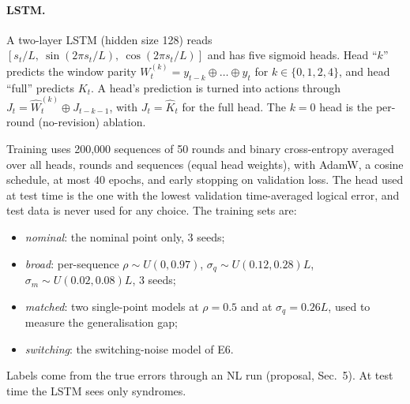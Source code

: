 \paragraph{LSTM.}
A two-layer LSTM (hidden size 128) reads $[s_t/L,\ \sin(2\pi s_t/L),\
\cos(2\pi s_t/L)]$ and has five sigmoid heads. Head ``$k$'' predicts the
window parity $W^{(k)}_t=y_{t-k}\oplus\dots\oplus y_t$ for
$k\in\{0,1,2,4\}$, and head ``full'' predicts $K_t$. A head's prediction is
turned into actions through $J_t=\hat W^{(k)}_t\oplus J_{t-k-1}$, with
$J_t=\hat K_t$ for the full head. The $k=0$ head is the per-round
(no-revision) ablation.

Training uses 200{,}000 sequences of 50 rounds and binary cross-entropy
averaged over all heads, rounds and sequences (equal head weights), with
AdamW, a cosine schedule, at most 40 epochs, and early stopping on
validation loss. The head used at test time is the one with the
lowest validation time-averaged logical error, and test data is never used
for any choice. The training sets are:
\begin{itemize}
  \item \emph{nominal}: the nominal point only, 3 seeds;
  \item \emph{broad}: per-sequence $\rho\sim U(0,0.97)$,
    $\sigma_q\sim U(0.12,0.28)L$, $\sigma_m\sim U(0.02,0.08)L$, 3 seeds;
  \item \emph{matched}: two single-point models at $\rho=0.5$ and at
    $\sigma_q=0.26L$, used to measure the generalisation gap;
  \item \emph{switching}: the switching-noise model of E6.
\end{itemize}
Labels come from the true errors through an NL run (proposal, Sec.~5).
At test time the LSTM sees only syndromes.

